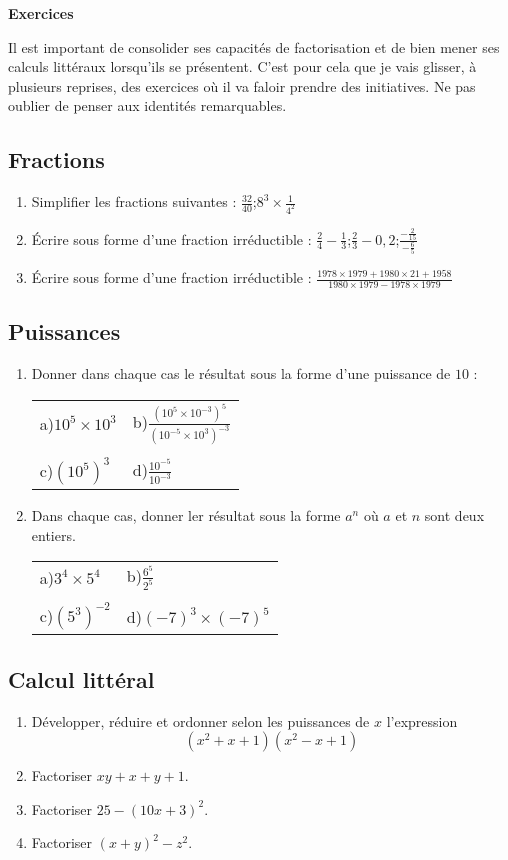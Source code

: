 \documentclass[17pt]{article}
\begin{document}
\newpage

\begin{center}
	\LARGE\bfseries Exercices
\end{center}
Il est important de consolider ses capacités de factorisation et de bien mener ses calculs littéraux lorsqu'ils se présentent. C'est pour cela que je vais glisser, à plusieurs reprises, des exercices où il va faloir prendre des initiatives. Ne pas oublier de penser aux identités remarquables.

\subsection*{Fractions}
\begin{enumerate}
	\item Simplifier les fractions suivantes : $\frac{32}{40}$;\quad $8^3\times\frac1{4^2}$
	\item Écrire sous forme d'une fraction irréductible : $\frac24-\frac13$;\quad $\frac23-0,2$;\quad $\frac{-\frac2{15}}{-\frac65}$
	\item Écrire sous forme d'une fraction irréductible : $\frac{1 978\times1 979+1 980\times21+1958}{1 980\times1 979−1 978\times1 979}$
\end{enumerate}

\subsection*{Puissances}
\begin{enumerate}
	\item Donner dans chaque cas le résultat sous la forme d'une puissance de $10$ :
	\begin{center}
		\begin{tabular}{p{6cm} p{6cm}}
			a)\quad $10^5\times 10^3$ & b)\quad $\frac{(10^5\times 10^{-3})^5}{(10^{-5}\times 10^3)^{-3}}$\\\\
			c)\quad $(10^5)^3$ & d)\quad $\frac{10^{-5}}{10^{-3}}$
		\end{tabular}
	\end{center}
	\item Dans chaque cas, donner ler résultat sous la forme $a^n$ où $a$ et $n$ sont deux entiers.
	\begin{center}
		\begin{tabular}{p{6cm} p{6cm}}
			a)\quad $3^4\times 5^4$ & b)\quad $\frac{6^5}{2^5}$\\\\
			c)\quad $(5^3)^{-2}$ & d)\quad $(-7)^3\times (-7)^5$
		\end{tabular}
	\end{center}
\end{enumerate}

\subsection*{Calcul littéral}
\begin{enumerate}
	\item Développer, réduire et ordonner selon les puissances de $x$ l'expression \[(x^2+x+1)(x^2-x+1)\]
	\item Factoriser $xy+x+y+1$.
	\item Factoriser $25-(10x+3)^2$.
	\item Factoriser $(x+y)^2-z^2$.
\end{enumerate}
\end{document}
